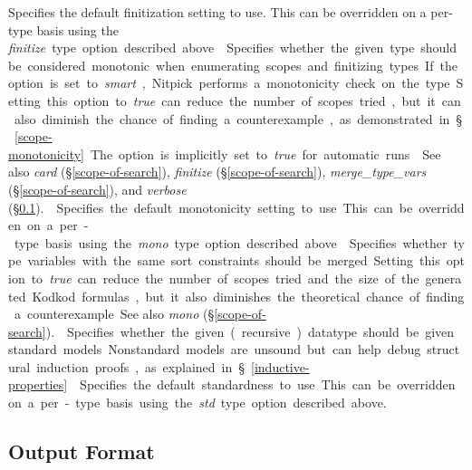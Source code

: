 \documentclass[a4paper,12pt]{article}
\begin{document}
\begin{enum}
Specifies the default finitization setting to use. This can be overridden on a
per-type basis using the \textit{finitize}~\qty{type} option described above.

Specifies whether the given type should be considered monotonic when enumerating
scopes and finitizing types. If the option is set to \textit{smart}, Nitpick
performs a monotonicity check on the type. Setting this option to \textit{true}
can reduce the number of scopes tried, but it can also diminish the chance of
finding a counterexample, as demonstrated in \S\ref{scope-monotonicity}. The
option is implicitly set to \textit{true} for automatic runs.

\nopagebreak
{\small See also \textit{card} (\S\ref{scope-of-search}),
\textit{finitize} (\S\ref{scope-of-search}),
\textit{merge\_type\_vars} (\S\ref{scope-of-search}), and \textit{verbose}
(\S\ref{output-format}).}

Specifies the default monotonicity setting to use. This can be overridden on a
per-type basis using the \textit{mono}~\qty{type} option described above.

Specifies whether type variables with the same sort constraints should be
merged. Setting this option to \textit{true} can reduce the number of scopes
tried and the size of the generated Kodkod formulas, but it also diminishes the
theoretical chance of finding a counterexample.

{\small See also \textit{mono} (\S\ref{scope-of-search}).}

Specifies whether the given (recursive) datatype should be given standard
models. Nonstandard models are unsound but can help debug structural induction
proofs, as explained in \S\ref{inductive-properties}.

Specifies the default standardness to use. This can be overridden on a per-type
basis using the \textit{std}~\qty{type} option described above.
\end{enum}

\subsection{Output Format}
\label{output-format}
\end{document}
